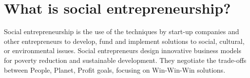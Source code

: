 \section{What is social entrepreneurship?}
Social entrepreneurship is the use of the techniques by start-up companies and other entrepreneurs to develop, fund and implement solutions to social, cultural, or environmental issues. Social entrepreneurs design innovative business models for poverty reduction and sustainable development. They negotiate the trade-offs between People, Planet, Profit goals, focusing on Win-Win-Win
solutions.

\clearpage